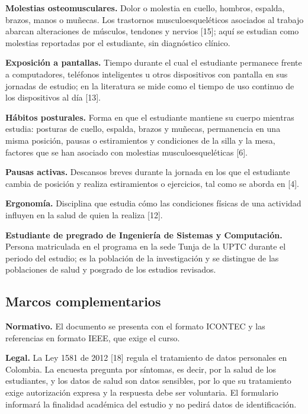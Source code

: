 \medskip
\noindent\textbf{Molestias osteomusculares.} Dolor o molestia en cuello, hombros, espalda,
brazos, manos o muñecas. Los trastornos musculoesqueléticos asociados al trabajo abarcan
alteraciones de músculos, tendones y nervios [15]; aquí se estudian como molestias
reportadas por el estudiante, sin diagnóstico clínico.

\medskip
\noindent\textbf{Exposición a pantallas.} Tiempo durante el cual el estudiante permanece
frente a computadores, teléfonos inteligentes u otros dispositivos con pantalla en sus
jornadas de estudio; en la literatura se mide como el tiempo de uso continuo de los
dispositivos al día [13].

\medskip
\noindent\textbf{Hábitos posturales.} Forma en que el estudiante mantiene su cuerpo mientras
estudia: posturas de cuello, espalda, brazos y muñecas, permanencia en una misma posición,
pausas o estiramientos y condiciones de la silla y la mesa, factores que se han asociado
con molestias musculoesqueléticas [6].

\medskip
\noindent\textbf{Pausas activas.} Descansos breves durante la jornada en los que el
estudiante cambia de posición y realiza estiramientos o ejercicios, tal como se aborda en
[4].

\medskip
\noindent\textbf{Ergonomía.} Disciplina que estudia cómo las condiciones físicas de una
actividad influyen en la salud de quien la realiza [12].

\medskip
\noindent\textbf{Estudiante de pregrado de Ingeniería de Sistemas y Computación.} Persona
matriculada en el programa en la sede Tunja de la UPTC durante el periodo del estudio; es la
población de la investigación y se distingue de las poblaciones de salud y posgrado de los
estudios revisados.

\subsection{Marcos complementarios}

\noindent\textbf{Normativo.} El documento se presenta con el formato ICONTEC y las
referencias en formato IEEE, que exige el curso.

\medskip
\noindent\textbf{Legal.} La Ley 1581 de 2012 [18] regula el tratamiento de datos personales
en Colombia. La encuesta pregunta por síntomas, es decir, por la salud de los estudiantes, y
los datos de salud son datos sensibles, por lo que su tratamiento exige autorización
expresa y la respuesta debe ser voluntaria. El formulario informará la finalidad académica
del estudio y no pedirá datos de identificación.

